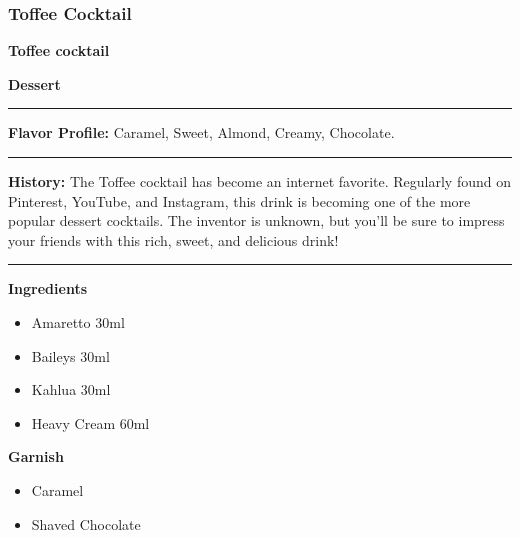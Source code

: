 \subsubsection{Toffee Cocktail}
\noindent
\begin{minipage}{.49\textwidth}
    \noindent\textbf{\LARGE Toffee cocktail}
\end{minipage}
\hspace{.02\textwidth}
\begin{minipage}{.49\textwidth}
    \raggedleft
    \textbf{\large Dessert}\\
\end{minipage}
\vspace{.5em}\hrule\vspace{.5em}
\noindent
\textbf{\large Flavor Profile:} Caramel, Sweet, Almond, Creamy, Chocolate.
\vspace{.5em}\hrule\vspace{.5em}
\noindent
\textbf{\large History:} The Toffee cocktail has become an internet favorite. Regularly found on Pinterest, YouTube, and Instagram, this drink is becoming one of the more popular dessert cocktails. The inventor is unknown, but you'll be sure to impress your friends with this rich, sweet, and delicious drink!
\vspace{.5em}\hrule\vspace{.5em}
\noindent
\begin{minipage}[t]{.49\textwidth}
    \noindent
    \textbf{\large Ingredients}
    \begin{itemize}
        \item Amaretto 30ml
        \item Baileys 30ml
        \item Kahlua 30ml
        \item Heavy Cream 60ml
    \end{itemize}
    \noindent
    \textbf{\large Garnish}
    \begin{itemize}
        \item Caramel
        \item Shaved Chocolate
    \end{itemize}
\end{minipage}
